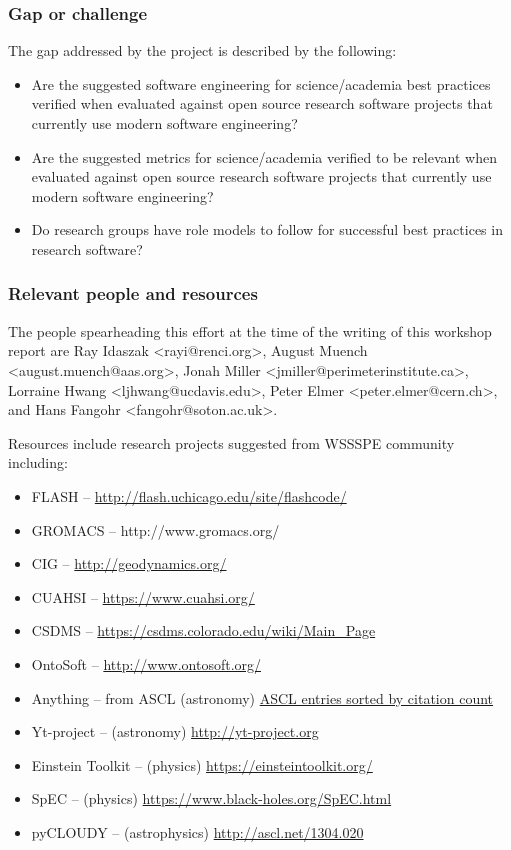 \subsubsection{Gap or challenge}

The gap addressed by the project is described by the following:
\begin{itemize}
\item Are the suggested software engineering for science/academia best practices verified when evaluated against open source research software projects that currently use modern software engineering?
\item Are the suggested metrics for science/academia verified to be relevant when evaluated against open source research software projects that currently use modern software engineering?
\item Do research groups have role models to follow for successful best practices in research software?
\end{itemize}

\subsubsection{Relevant people and resources}

The people spearheading this effort at the time of the writing of this workshop report are Ray Idaszak <rayi@renci.org>, August Muench <august.muench@aas.org>, Jonah Miller <jmiller@perimeterinstitute.ca>, Lorraine Hwang <ljhwang@ucdavis.edu>, Peter Elmer <peter.elmer@cern.ch>, and Hans Fangohr <fangohr@soton.ac.uk>. 

\noindent
Resources include research projects suggested from WSSSPE community including:
\begin{itemize}
\item FLASH -- \url{http://flash.uchicago.edu/site/flashcode/}
\item GROMACS -- http://www.gromacs.org/
\item CIG -- \url{http://geodynamics.org/}
\item CUAHSI -- \url{https://www.cuahsi.org/}
\item CSDMS -- \url{https://csdms.colorado.edu/wiki/Main_Page}
\item OntoSoft -- \url{http://www.ontosoft.org/}
\item Anything -- from ASCL (astronomy) \href{https://ui.adsabs.harvard.edu/#search/q=bibstem%3A%22ASCL%22&sort=citation_count%20desc%2C%20bibcode%20desc}{ ASCL entries sorted by citation count}
\item Yt-project -- (astronomy) \url{http://yt-project.org}
\item Einstein Toolkit -- (physics) \url{https://einsteintoolkit.org/}
\item SpEC -- (physics) \url{https://www.black-holes.org/SpEC.html}
\item pyCLOUDY -- (astrophysics) \url{http://ascl.net/1304.020}
\end{itemize}

